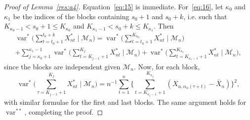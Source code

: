 \documentclass[12pt]{article}
\theoremstyle{definition}
\DeclareMathOperator{\var}{var}
\begin{document}
\begin{proof}[Proof of Lemma~\ref{res:a4}]
  Equation~\eqref{eq:15} is immediate.  For~\eqref{eq:16}, let
  $\kappa_0$ and $\kappa_1$ be the indices of the blocks containing
  $s_0+1$ and $s_0 + k$, i.e. such that $K_{\kappa_0 - 1} < s_0 + 1
  \leq K_{\kappa_0}$ and $K_{\kappa_1 - 1} < s_0 + k \leq
  K_{\kappa_1}$.  Then
  \begin{multline}
    \var^*\Bigg(\sum_{t=t_0+1}^{t_0+k} X_{nt}^* \;\Bigg|\;
    \mathcal{M}_n\Bigg) = \var^{*}\Bigg( \sum_{t=t_0+1}^{K_{\kappa_0}}
    X_{nt}^* \;\Bigg|\; \mathcal{M}_n \Bigg) 
    \\ 
    + \sum_{j=\kappa_0 + 1}^{\kappa_1 - 1} \var^{*}\Bigg(
    \sum_{t=K_{j-1}+1}^{K_{j}} X_{nt}^* \;\Bigg|\; \mathcal{M}_n
    \Bigg) + \var^{*}\Bigg( \sum_{t=K_{\kappa_1 - 1}+1}^{K_{\kappa_1}}
    X_{nt}^* \;\Bigg|\; \mathcal{M}_n \Bigg),
  \end{multline}
  since the blocks are independent given $\mathcal{M}_n$.  Now, for
  each block,
  \begin{equation}
    \var^{*}\Bigg(
    \sum_{\tau=K_{j-1}+1}^{K_{j}} X_{nt}^* \;\Bigg|\; \mathcal{M}_n
    \Bigg) = n^{-1} \sum_{t=1}^n 
    \Bigg\{\sum_{t=K_{\kappa_j -1}+1}^{K_{\kappa_j}} (X_{n,\alpha_n(\tau+t)} -
    \bar{X}_n)\Bigg\}^2,
  \end{equation}
  with similar formulae for the first and last blocks.
  The same argument holds for $\var^{**}$, completing the proof.
\end{proof}
\end{document}
